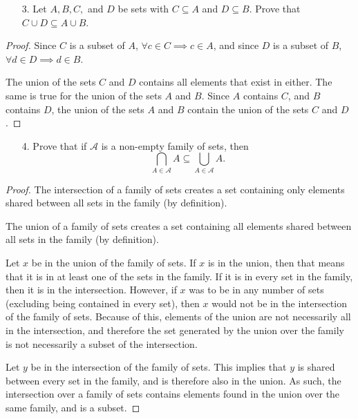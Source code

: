 \documentclass[10pt]{article}
\theoremstyle{definition}
\theoremstyle{plain}
\begin{document}
\pagebreak



\begin{enumerate}
  \item[3.] Let $A, B, C,$ and $D$ be sets with $C \subseteq A$ and $D \subseteq B$.  Prove that $C \cup D \subseteq A \cup B$.
\end{enumerate}

\begin{proof}
  Since $C$ is a subset of $A$, $\forall c\in C \implies c\in A$, and since $D$ is a subset of $B$, $\forall d\in D \implies d\in B$. \\

  \par The union of the sets $C$ and $D$ contains all elements that exist in either. The same is true for the union of the sets $A$ and $B$. Since $A$ contains $C$, and $B$ contains $D$, the union of the sets $A$ and $B$ contain the union of the sets $C$ and $D$.
\end{proof}



\pagebreak



\begin{enumerate}
  \item[4.] Prove that if $\mathcal{A}$ is a non-empty family of sets, then $$\bigcap_{A \in \mathcal{A}}A \subseteq \bigcup_{A \in \mathcal{A}} A.$$
\end{enumerate}

\begin{proof}
  The intersection of a family of sets creates a set containing only elements shared between all sets in the family (by definition). \\

  \par The union of a family of sets creates a set containing all elements shared between all sets in the family (by definition). \\

  \par Let $x$ be in the union of the family of sets. If $x$ is in the union, then that means that it is in at least one of the sets in the family. If it is in every set in the family, then it is in the intersection. However, if $x$ was to be in any number of sets (excluding being contained in every set), then $x$ would not be in the intersection of the family of sets. Because of this, elements of the union are not necessarily all in the intersection, and therefore the set generated by the union over the family is not necessarily a subset of the intersection. \\

  \par Let $y$ be in the intersection of the family of sets. This implies that $y$ is shared between every set in the family, and is therefore also in the union. As such, the intersection over a family of sets contains elements found in the union over the same family, and is a subset.
\end{proof}
\end{document}
